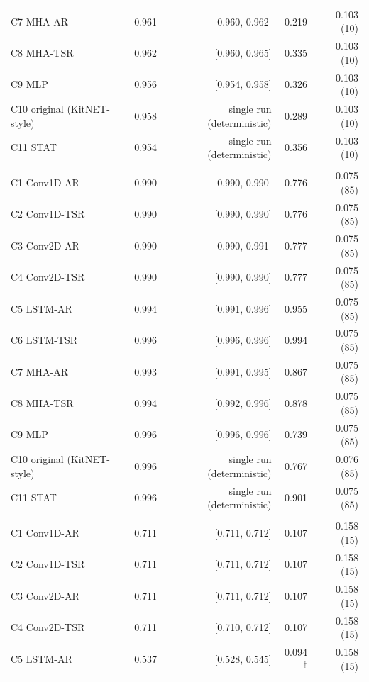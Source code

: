 \begin{longtable}{@{}lrrrr@{}}
\quad C7 MHA-AR & 0.961 & [0.960, 0.962] & 0.219 & 0.103 (10) \\
\quad C8 MHA-TSR & 0.962 & [0.960, 0.965] & 0.335 & 0.103 (10) \\
\quad C9 MLP & 0.956 & [0.954, 0.958] & 0.326 & 0.103 (10) \\
\quad C10 original (KitNET-style) & 0.958 & single run (deterministic) & 0.289 & 0.103 (10) \\
\quad C11 STAT & 0.954 & single run (deterministic) & 0.356 & 0.103 (10) \\
\addlinespace
\multicolumn{5}{l}{\textit{KNAD SSDP Flood} --- $n=2$ seed(s); prevalence $p=0.413$; $F_{1,\mathrm{trivial}}=0.584$; AUC$_t=0.996$} \\
\quad C1 Conv1D-AR & 0.990 & [0.990, 0.990] & 0.776 & 0.075 (85) \\
\quad C2 Conv1D-TSR & 0.990 & [0.990, 0.990] & 0.776 & 0.075 (85) \\
\quad C3 Conv2D-AR & 0.990 & [0.990, 0.991] & 0.777 & 0.075 (85) \\
\quad C4 Conv2D-TSR & 0.990 & [0.990, 0.990] & 0.777 & 0.075 (85) \\
\quad C5 LSTM-AR & 0.994 & [0.991, 0.996] & 0.955 & 0.075 (85) \\
\quad C6 LSTM-TSR & 0.996 & [0.996, 0.996] & 0.994 & 0.075 (85) \\
\quad C7 MHA-AR & 0.993 & [0.991, 0.995] & 0.867 & 0.075 (85) \\
\quad C8 MHA-TSR & 0.994 & [0.992, 0.996] & 0.878 & 0.075 (85) \\
\quad C9 MLP & 0.996 & [0.996, 0.996] & 0.739 & 0.075 (85) \\
\quad C10 original (KitNET-style) & 0.996 & single run (deterministic) & 0.767 & 0.076 (85) \\
\quad C11 STAT & 0.996 & single run (deterministic) & 0.901 & 0.075 (85) \\
\addlinespace
\multicolumn{5}{l}{\textit{KNAD SSL Renegotiation} --- $n=2$ seed(s); prevalence $p=0.051$; $F_{1,\mathrm{trivial}}=0.098$; AUC$_t=0.791$} \\
\quad C1 Conv1D-AR & 0.711 & [0.711, 0.712] & 0.107 & 0.158 (15) \\
\quad C2 Conv1D-TSR & 0.711 & [0.711, 0.712] & 0.107 & 0.158 (15) \\
\quad C3 Conv2D-AR & 0.711 & [0.711, 0.712] & 0.107 & 0.158 (15) \\
\quad C4 Conv2D-TSR & 0.711 & [0.710, 0.712] & 0.107 & 0.158 (15) \\
\quad C5 LSTM-AR & 0.537 & [0.528, 0.545] & 0.094$^{\ddagger}$ & 0.158 (15) \\

\end{longtable}
